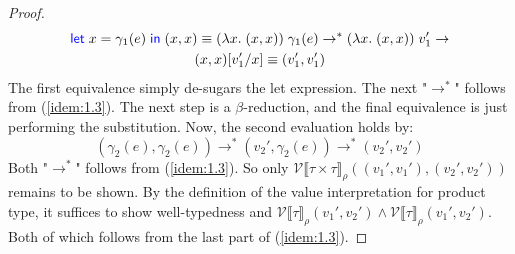 \documentclass[a4paper, 11pt]{report}
\theoremstyle{definition}
\newcommand{\var}{x}
\newcommand{\expr}{e}
\newcommand{\val}{v}
\newcommand{\subst}[3]{#1{\left[#3 \middle/ #2 \right]}}
\newcommand{\Tprod}[2]{#1 \times #2}
\newcommand{\typ}{\tau}
\newcommand{\step}{\rightarrow}
\newcommand{\stepS}{\rightarrow^*}
\newcommand{\ValInp}[2]{\mathcal{V} \llbracket #1 \rrbracket_{#2}}
\begin{document}
\begin{proof}
\begin{multline}
    \Let \var = \gamma_1(\expr) in (\var, \var) \equiv (\fun \var . (\var, \var)) \; \gamma_1(\expr) \stepS (\fun \var . (\var, \var)) \; \val_1' \step\\ \subst{(\var, \var)}{\var}{\val_1'} \equiv (\val_1', \val_1')
  \end{multline}
  The first equivalence simply de-sugars the let expression. The next "$\stepS$" follows from (\ref{idem:1.3}). The next step is a $\beta$-reduction, and the final equivalence is just performing the substitution. Now, the second evaluation holds by:
  \begin{equation}
    (\gamma_2(\expr), \gamma_2(\expr)) \stepS (\val_2', \gamma_2(\expr)) \stepS (\val_2', \val_2')
  \end{equation}
  Both "$\stepS$" follows from (\ref{idem:1.3}). So only $\ValInp{\Tprod{\typ}{\typ}}{\rho}((\val_1', \val_1'), (\val_2', \val_2'))$ remains to be shown. By the definition of the value interpretation for product type, it suffices to show well-typedness and $\ValInp{\typ}{\rho}(\val_1', \val_2') \land \ValInp{\typ}{\rho}(\val_1', \val_2')$. Both of which follows from the last part of (\ref{idem:1.3}).
\end{proof}
\end{document}
